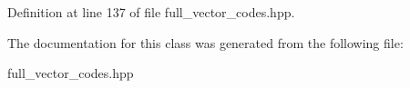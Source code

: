 Definition at line 137 of file full\-\_\-vector\-\_\-codes.\-hpp.



The documentation for this class was generated from the following file\-:\begin{DoxyCompactItemize}
\item 
full\-\_\-vector\-\_\-codes.\-hpp\end{DoxyCompactItemize}
